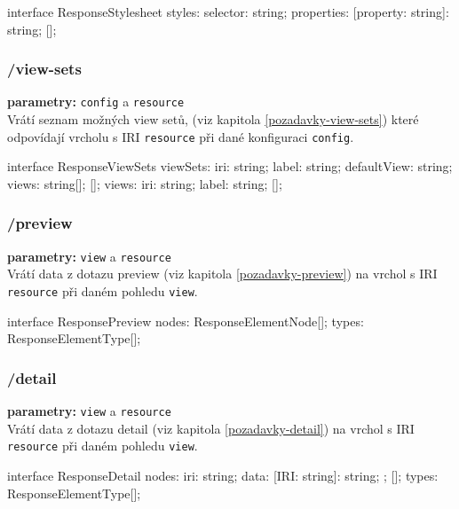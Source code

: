 \begin{code}
interface ResponseStylesheet {
    styles: {
        selector: string;
        properties: {
            [property: string]: string;
        }
    }[];
}
\end{code}

\subsubsection{/view-sets}
\textbf{parametry:} \texttt{config} a \texttt{resource} \\
Vrátí seznam možných view setů, (viz kapitola \ref{pozadavky-view-sets}) které odpovídají vrcholu s IRI \texttt{resource} při dané konfiguraci \texttt{config}.

\begin{code}
interface ResponseViewSets {
    viewSets: {
        iri: string;
        label: string;
        defaultView: string;
        views: string[];
    }[];
    views: {
        iri: string;
        label: string;
    }[];
}
\end{code}

\subsubsection{/preview}
\textbf{parametry:} \texttt{view} a \texttt{resource} \\
Vrátí data z dotazu preview (viz kapitola \ref{pozadavky-preview}) na vrchol s IRI \texttt{resource} při daném pohledu \texttt{view}.

\begin{code}
interface ResponsePreview {
    nodes: ResponseElementNode[];
    types: ResponseElementType[];
}
\end{code}

\subsubsection{/detail}
\textbf{parametry:} \texttt{view} a \texttt{resource} \\
Vrátí data z dotazu detail (viz kapitola \ref{pozadavky-detail}) na vrchol s IRI \texttt{resource} při daném pohledu \texttt{view}.

\begin{code}
interface ResponseDetail {
    nodes: {
        iri: string;
        data: {
            [IRI: string]: string;
        };
    }[];
    types: ResponseElementType[];
}
\end{code}

